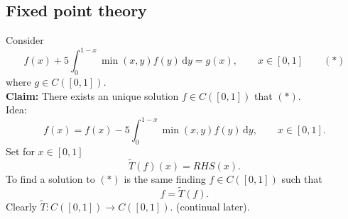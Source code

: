 
\subsection{Fixed point theory} 
\label{sub:fixed_point_theory}
\begin{beispiel}
	Consider
	\[
		f(x)+ 5 \int_{0}^{1-x} \min(x,y)f(y) \,\mathrm{d}y = g(x), \qquad x \in [0,1] \qquad (*)
	\]
	where $g \in C([0,1])$. \\ 
	\textbf{Claim:} \text{    }     There exists an unique solution $f \in C([0,1])$ that $(*)$. \\
	Idea:
	\[
		f(x) = f(x) - 5 \int_{0}^{1-x} \min(x,y)f(y) \,\mathrm{d}y, \qquad x \in [0,1].
	\]
	Set for $x \in [0,1]$ 
	\[
			\tilde T(f)(x) = RHS(x).
	\]
	To find a solution to $(*)$ is the same finding $f \in C([0,1])$ such that 
	\[
		f = \tilde T(f).
	\]
	Clearly $ \tilde T : C([0,1]) \to C([0,1])$. (continual later).
\end{beispiel}

